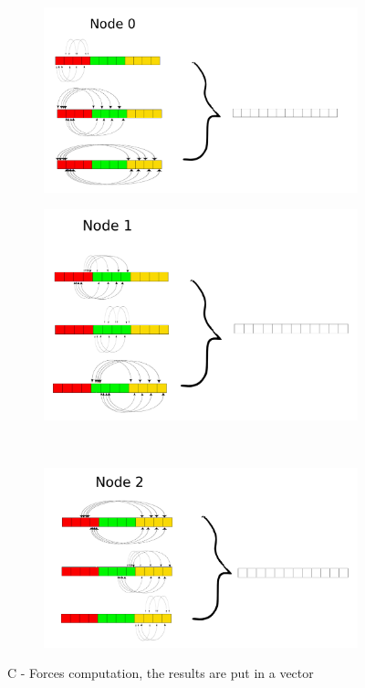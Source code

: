 \documentclass[a4paper]{article}
\begin{document}
\begin{figure}[ht]
\begin{subfigure}{.5\textwidth}
  \centering
  \includegraphics[width=1\linewidth]{force_calculation_0}
\end{subfigure} %
\begin{subfigure}{.5\textwidth}
  \centering
  \includegraphics[width=1\linewidth]{force_calculation_1}
\end{subfigure} \\ %
\begin{subfigure}{\textwidth}
  \centering
  \includegraphics[width=0.5\linewidth]{force_calculation_2}
\end{subfigure}
  \caption{C - Forces computation, the results are put in a vector}
  \label{fig:C1}
\end{figure}
\FloatBarrier
\end{document}
